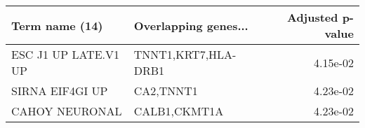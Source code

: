 \begin{tabular}{llr}
\toprule
      Term name (14) & Overlapping genes... &  Adjusted p-value \\
\midrule
ESC J1 UP LATE.V1 UP &  TNNT1,KRT7,HLA-DRB1 &          4.15e-02 \\
     SIRNA EIF4GI UP &            CA2,TNNT1 &          4.23e-02 \\
      CAHOY NEURONAL &         CALB1,CKMT1A &          4.23e-02 \\
\bottomrule
\end{tabular}
